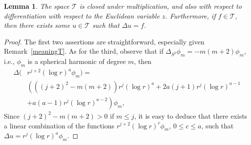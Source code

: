 \documentclass[12pt]{article}
\newtheorem{lem}[thm]{Lemma}
\newtheorem{defn}[thm]{Definition}
\newcommand{\calT}{{\mathcal T}}
\begin{document}
\begin{lem}\label{stability T}
The space $\calT$ is closed under multiplication, and also with respect to differentiation with respect to the
Euclidean variable $z$. Furthermore, if $f \in \calT$, then there exists some $u \in \calT$ such that $\Delta u = f$. 
\end{lem}
\begin{proof}
The first two assertions are straightforward, especially given Remark~\ref{meaningT}. As for the third, observe that if 
$\Delta_{S^3} \phi_m = - m(m+2) \phi_m$, i.e., $\phi_m$ is a spherical harmonic of degree $m$, then %
\begin{equation}
\begin{split}
\Delta ( & r^{j+2}(\log r)^a \phi_m) = \\
& \left( (  (j+2)^2-m(m+2)) r^j (\log r)^a + 2 a (j+1) r^j (\log r)^{a-1}\right. \\ & 
+ \left. a(a-1) r^j (\log r)^{a-2}\right) \phi_m,
\end{split}
\label{laplacien phg}
\end{equation}
Since $(j+2)^2 - m(m+2) > 0$ if $m \leq j$, it is easy to deduce that there exists a linear combination of
the functions $r^{j+2} (\log r)^c \phi_m$, $0 \leq c \leq a$, such that $\Delta u = r^j (\log r)^a \phi_m$. 
\end{proof}



        
     
\end{document}
